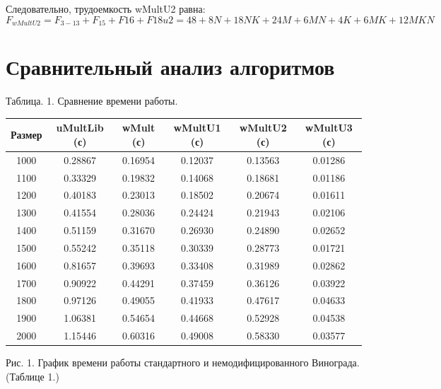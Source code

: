 \documentclass[12pt]{report}
\begin{document}
Следовательно, трудоемкость wMultU2 равна:
\begin{equation}
	F_{wMultU2} = F_{3-13} + F_{15} + F{16} + F{18u2}  = 48 + 8N + 18NK + 24M + 6MN + 4K + 6MK + 12MKN
\end{equation}


\section{Сравнительный анализ алгоритмов}

\begin{center}
Таблица. 1. Сравнение времени работы.   
	\begin{tabular}{|c c c c c c|} 
 	\hline
	Размер & uMultLib (с) & wMult (с) & wMultU1 (с) & wMultU2 (с) & wMultU3 (с) \\ [0.5ex] 
 	\hline\hline
 	1000 &  0.28867 & 0.16954 & 0.12037 & 0.13563 & 0.01286 \\
 	\hline
 	1100 &  0.33329 & 0.19832 & 0.14068 & 0.18681 & 0.01186 \\
 	\hline
	1200 &  0.40183 & 0.23013 & 0.18502 & 0.20674 & 0.01611 \\
	\hline
	1300 &  0.41554 & 0.28036 & 0.24424 & 0.21943 & 0.02106 \\
	\hline
	1400 &  0.51159 & 0.31670 & 0.26930 & 0.24890 & 0.02652 \\
	\hline
	1500 &  0.55242 & 0.35118 & 0.30339 & 0.28773 & 0.01721 \\
	\hline
	1600 &  0.81657 & 0.39693 & 0.33408 & 0.31989 & 0.02862 \\
	\hline
	1700 &  0.90922 & 0.44291 & 0.37459 & 0.36126 & 0.03922 \\
	\hline
	1800 &  0.97126 & 0.49055 & 0.41933 & 0.47617 & 0.04633 \\
	\hline
	1900 &  1.06381 & 0.54654 & 0.44668 & 0.52928 & 0.04538 \\
	\hline
	2000 &  1.15446 & 0.60316 & 0.49008 & 0.58330 & 0.03577 \\
	\hline
	\end{tabular}
\end{center}

\begin{center}

Рис. 1. График времени работы стандартного и немодифицированного Винограда. (Таблице 1.)
\end{center}
\end{document}
